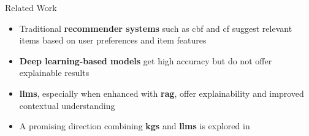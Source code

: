 \begin{tframe}{Related Work}

\begin{itemize}
    \item Traditional \textbf{recommender systems} such as \gls{cbf} and \gls{cf} suggest relevant items based on user preferences and item features \cite{Plexousakis2005, WEI201729, Lu2012}
    \vspace{.1cm}
    \item \textbf{Deep learning-based models} get high accuracy but do not offer explainable results \cite{Zhao2024}
    \vspace{.1cm}
    \item \textbf{\glspl{llm}}, especially when enhanced with \textbf{\gls{rag}}, offer explainability and improved contextual understanding \cite{Deldjoo2024}
    \vspace{.1cm}
    \item A promising direction combining \textbf{\glspl{kg}} and \textbf{\glspl{llm}} is explored in \cite{Yang2024, Pan2024}
\end{itemize}
\end{tframe}